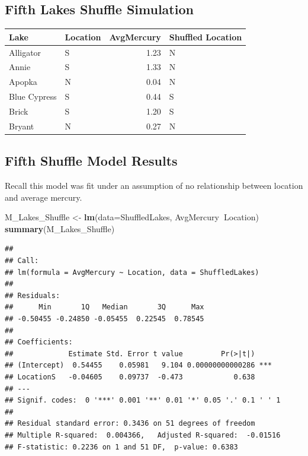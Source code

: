 \documentclass[]{book}
\newenvironment{Shaded}{\begin{snugshade}}{\end{snugshade}}
\newcommand{\KeywordTok}[1]{\textcolor[rgb]{0.13,0.29,0.53}{\textbf{#1}}}
\newcommand{\DataTypeTok}[1]{\textcolor[rgb]{0.13,0.29,0.53}{#1}}
\newcommand{\DecValTok}[1]{\textcolor[rgb]{0.00,0.00,0.81}{#1}}
\newcommand{\StringTok}[1]{\textcolor[rgb]{0.31,0.60,0.02}{#1}}
\newcommand{\OperatorTok}[1]{\textcolor[rgb]{0.81,0.36,0.00}{\textbf{#1}}}
\newcommand{\NormalTok}[1]{#1}
\begin{document}
\subsection{Fifth Lakes Shuffle
Simulation}\label{fifth-lakes-shuffle-simulation}

\begin{Shaded}
\end{Shaded}

\begin{tabular}{l|l|r|l}
\hline
Lake & Location & AvgMercury & Shuffled Location\\
\hline
Alligator & S & 1.23 & N\\
\hline
Annie & S & 1.33 & N\\
\hline
Apopka & N & 0.04 & N\\
\hline
Blue Cypress & S & 0.44 & S\\
\hline
Brick & S & 1.20 & S\\
\hline
Bryant & N & 0.27 & N\\
\hline
\end{tabular}

\subsection{Fifth Shuffle Model
Results}\label{fifth-shuffle-model-results}

Recall this model was fit under an assumption of no relationship between
location and average mercury.

\begin{Shaded}
\begin{Highlighting}[]
\NormalTok{M_Lakes_Shuffle <-}\StringTok{ }\KeywordTok{lm}\NormalTok{(}\DataTypeTok{data=}\NormalTok{ShuffledLakes, AvgMercury}\OperatorTok{~}\NormalTok{Location)}
\KeywordTok{summary}\NormalTok{(M_Lakes_Shuffle)}
\end{Highlighting}
\end{Shaded}

\begin{verbatim}
## 
## Call:
## lm(formula = AvgMercury ~ Location, data = ShuffledLakes)
## 
## Residuals:
##      Min       1Q   Median       3Q      Max 
## -0.50455 -0.24850 -0.05455  0.22545  0.78545 
## 
## Coefficients:
##             Estimate Std. Error t value         Pr(>|t|)    
## (Intercept)  0.54455    0.05981   9.104 0.00000000000286 ***
## LocationS   -0.04605    0.09737  -0.473            0.638    
## ---
## Signif. codes:  0 '***' 0.001 '**' 0.01 '*' 0.05 '.' 0.1 ' ' 1
## 
## Residual standard error: 0.3436 on 51 degrees of freedom
## Multiple R-squared:  0.004366,   Adjusted R-squared:  -0.01516 
## F-statistic: 0.2236 on 1 and 51 DF,  p-value: 0.6383
\end{verbatim}
\end{document}
